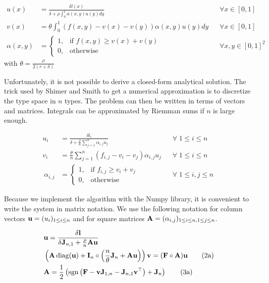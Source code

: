 \begin{align*}[left=\empheqlbrace]
	u(x) &= \frac{\delta l(x)}{\delta + \rho \int_{0}^{1} \alpha(x,y) u(y) dy} &&\forall x \in [0,1]\\
	v(x) &= \theta \int_{0}^{1} (f(x,y)-v(x)-v(y)) \alpha(x,y) u(y) dy &&\forall x \in [0,1]\\
	\alpha(x,y) &=
	\begin{cases}
		1, & \text{if } f(x,y) \geq v(x)+v(y)\\
		0, & \text{otherwise}
	\end{cases}
	&&\forall x,y \in [0,1]^2 
\end{align*}
with $\theta = \frac{\rho}{2(r+\delta)}$ 


Unfortunately, it is not possible to derive a closed-form analytical solution. The trick used by Shimer and Smith \citep{shimer_assortative_2000} to get a numerical approximation is to discretize the type space in $n$ types. The problem can then be written in terms of vectors and matrices. Integrals can be approximated by Riemman sums if $n$ is large enough.

\begin{align*}[left=\empheqlbrace]
	u_i &= \frac{\delta l_i}{\delta + \frac{\rho}{n} \sum\limits_{j=1}^{n} \alpha_{i,j} u_j} &&\forall \; 1 \leq i \leq n\\
	v_i &= \frac{\theta}{n} \sum_{j=1}^{n} (f_{i,j}-v_i-v_j) \alpha_{i,j} u_j &&\forall \; 1 \leq i \leq n\\\
	\alpha_{i,j} &=
	\begin{cases}
		1, & \text{if } f_{i,j} \geq v_i+v_j\\
		0, & \text{otherwise}
	\end{cases}
	&&\forall \; 1 \leq i,j \leq n\
\end{align*}


Because we implement the algorithm with the Numpy library, it is convenient to write the system in matrix notation. We use the following notation for column vectors $\boldsymbol{\mathbf{u}} = (u_i)_{1 \leq i \leq n}$ and for square matrices $\boldsymbol{\mathbf{A}} = (\alpha_{i,j})_{1 \leq i \leq n, 1 \leq j \leq n}$.





\begin{align}[left=\empheqlbrace]
	&\vect{u} = \frac{\delta \vect{l}}{\delta \vect{J}_{n,1} + \frac{\rho}{n} \vect{A}\vect{u}}\\
	&\left(\vect{A} \diag(\vect{u}) + \vect{I}_n \circ \left(\frac{n}{\theta} \vect{J}_n + \vect{A} \vect{u}\right)\right) \vect{v} = (\vect{F} \circ \vect{A}) \vect{u}
	\tag{2a}\\
	&\vect{A} = \frac{1}{2} \left( \sgn{\left( \vect{F} - \vect{v} \vect{J}_{1,n} - \vect{J}_{n,1} \vect{v}^\top \right)} + \vect{J}_n \right)
	\tag{3a}
\end{align}
 
